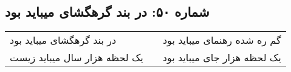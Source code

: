 \begin{center}
\section*{شماره ۵۰: در بند گرهگشای میباید بود}
\label{sec:050}
\begin{longtable}{l p{0.5cm} r}
در بند گرهگشای میباید بود
&&
گم ره شده رهنمای میباید بود
\\
یک لحظه هزار سال میباید زیست
&&
یک لحظه هزار جای میباید بود
\\
\end{longtable}
\end{center}

